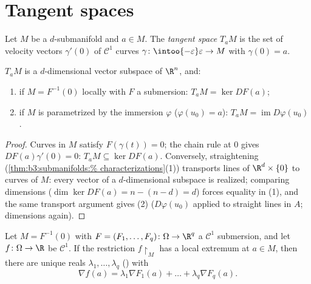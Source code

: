 \section{Tangent spaces}

\begin{definition}\label{def:b3:submanifolds:tangent}
Let $M$ be a $d$-submanifold and $a \in M$. The \emph{tangent
space} $T_aM$ is the set of velocity
vectors $\gamma'(0)$ of $\mathcal C^1$ curves $\gamma \colon
\intoo{-\varepsilon}\varepsilon \to M$ with $\gamma(0) = a$.
\end{definition}

\begin{proposition}\label{prop:b3:submanifolds:tangent}
$T_aM$ is a $d$-dimensional vector subspace of $\R^n$, and:
\begin{enumerate}
  \item if $M = F^{-1}(0)$ locally with $F$ a submersion:
        $T_aM = \ker DF(a)$;
  \item if $M$ is parametrized by the immersion $\varphi$
        ($\varphi(u_0) = a$): $T_aM =
        \operatorname{im}D\varphi(u_0)$.
\end{enumerate}
\end{proposition}

\begin{proof}
Curves in $M$ satisfy $F(\gamma(t)) = 0$; the chain rule at
$0$ gives $DF(a)\gamma'(0) = 0$: $T_aM \subseteq \ker DF(a)$.
Conversely, straightening (\cref{thm:b3:submanifolds:%
characterizations}(1)) transports lines of
$\R^d\times\{0\}$ to curves of $M$: every vector of a
$d$-dimensional subspace is realized; comparing dimensions
($\dim\ker DF(a) = n - (n - d) = d$) forces equality in (1),
and the same transport argument gives (2) ($D\varphi(u_0)$
applied to straight lines in $A$; dimensions again).
\end{proof}

\begin{theorem}
\label{thm:b3:submanifolds:lagrange}
Let $M = F^{-1}(0)$ with $F = (F_1, \dots, F_q) \colon \Omega
\to \R^q$ a $\mathcal C^1$ submersion, and let $f \colon
\Omega \to \R$ be $\mathcal C^1$. If the restriction
$f\restriction_M$ has a local extremum at $a \in M$, then
there are unique reals $\lambda_1, \dots, \lambda_q$
(\emph{}) with
\[
\nabla f(a) = \lambda_1\nabla F_1(a) + \dots +
\lambda_q\nabla F_q(a) .
\]
\end{theorem}

